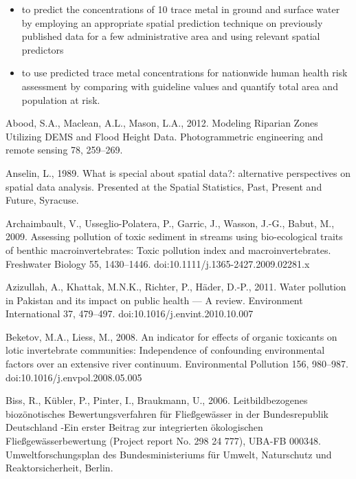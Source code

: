 \begin{itemize}
\item to predict the concentrations of 10 trace metal in ground and surface water by employing an appropriate spatial prediction technique on previously published data for a few administrative area and using relevant spatial predictors
\item to use predicted trace metal concentrations for nationwide human health risk assessment by comparing with guideline values and quantify total area and population at risk.
\end{itemize}

\begingroup

\renewcommand{\addcontentsline}[3]{}

\begin{thebibliography}

\bibitem{} \hangindent=1cm Abood, S.A., Maclean, A.L., Mason, L.A., 2012. Modeling Riparian Zones Utilizing DEMS and Flood Height Data. Photogrammetric engineering and remote sensing 78, 259–269.

\bibitem{} \hangindent=1cm Anselin, L., 1989. What is special about spatial data?: alternative perspectives on spatial data analysis. Presented at the Spatial Statistics, Past, Present and Future, Syracuse.

\bibitem{} \hangindent=1cm Archaimbault, V., Usseglio-Polatera, P., Garric, J., Wasson, J.-G., Babut, M., 2009. Assessing pollution of toxic sediment in streams using bio-ecological traits of benthic macroinvertebrates: Toxic pollution index and macroinvertebrates. Freshwater Biology 55, 1430–1446. doi:10.1111/j.1365-2427.2009.02281.x

\bibitem{} \hangindent=1cm Azizullah, A., Khattak, M.N.K., Richter, P., Häder, D.-P., 2011. Water pollution in Pakistan and its impact on public health — A review. Environment International 37, 479–497. doi:10.1016/j.envint.2010.10.007

\bibitem{} \hangindent=1cm Beketov, M.A., Liess, M., 2008. An indicator for effects of organic toxicants on lotic invertebrate communities: Independence of confounding environmental factors over an extensive river continuum. Environmental Pollution 156, 980–987. doi:10.1016/j.envpol.2008.05.005

\bibitem{} \hangindent=1cm Biss, R., Kübler, P., Pinter, I., Braukmann, U., 2006. Leitbildbezogenes biozönotisches Bewertungsverfahren für Fließgewässer in der Bundesrepublik Deutschland -Ein erster Beitrag zur integrierten ökologischen Fließgewässerbewertung (Project report No. 298 24 777), UBA-FB 000348. Umweltforschungsplan des Bundesministeriums für Umwelt, Naturschutz und Reaktorsicherheit, Berlin.


\end{thebibliography}
